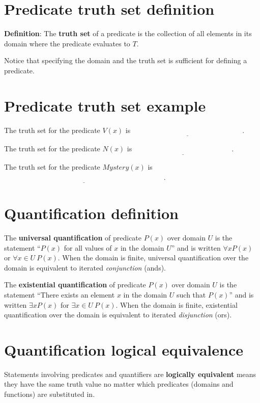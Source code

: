 \documentclass[12pt, oneside]{article}
\begin{document}
\section*{Predicate truth set definition}


{\bf Definition}: The {\bf truth  set} of a  predicate is the collection of all elements in its
domain where the predicate evaluates to $T$.

Notice that specifying the domain and the truth set is sufficient for defining
a predicate. \vfill
\section*{Predicate truth set example}


The truth set for the predicate $V(x)$ is $\underline{\phantom{\{ x ~\mid~ V(x) = T\} = \{ 001, 010, 011 \}}}$.

The truth set for the predicate $N(x)$ is $\underline{\phantom{\{ x ~\mid~ N(x) = T\} = \{ 101, 111 \}}}$.

The truth set for the predicate $Mystery(x)$ is $\underline{\phantom{\{ x ~\mid~ Mystery(x) = T\} = \{ 000, 001, 010, 101, 111 \}}}$.


\vfill \vfill
\section*{Quantification definition}


The {\bf universal quantification} of predicate $P(x)$ over
domain $U$ is the statement ``$P(x)$ for all values of $x$ in the domain $U$''
and is written $\forall x P(x)$ or $\forall x \in U ~P(x)$. 
When the domain is finite, universal quantification over the domain 
is equivalent to iterated {\it conjunction} (ands).

The {\bf existential quantification} of predicate $P(x)$ 
over domain $U$ is the statement ``There exists an element $x$ 
in the domain $U$ such that $P(x)$'' and is written $\exists x P(x)$
for $\exists x \in U ~P(x)$. 
When the domain is finite, existential quantification over the domain 
is equivalent to iterated {\it disjunction} (ors).
 \vfill
\section*{Quantification logical equivalence}


Statements involving predicates and quantifiers are {\bf logically equivalent} 
means they have the same truth value no matter which predicates (domains and functions) 
are substituted in. 
\end{document}
